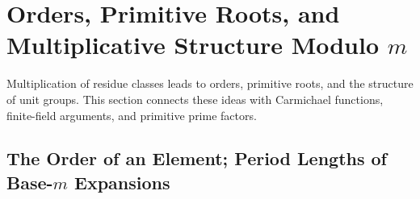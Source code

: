 \documentclass[11pt]{article}
\theoremstyle{ntstyle}
\begin{document}
\section{Orders, Primitive Roots, and Multiplicative Structure Modulo \texorpdfstring{$m$}{m}}

Multiplication of residue classes leads to orders, primitive roots, and the structure of unit groups. This section
connects these ideas with Carmichael functions, finite-field arguments, and primitive prime factors.

\subsection{The Order of an Element; Period Lengths of Base-\texorpdfstring{$m$}{m} Expansions}\label{subsec:6.1}
\end{document}
